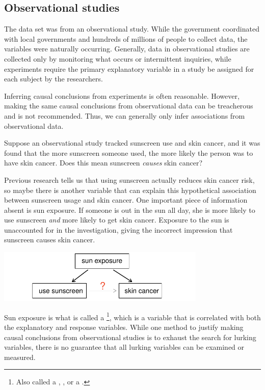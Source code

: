 \subsection{Observational studies}

The  data set was from an observational study. While the government coordinated with local governments and hundreds of millions of people to collect data, the variables were naturally occurring. Generally, data in observational studies are collected only by monitoring what occurs or intermittent inquiries, while experiments require the primary explanatory variable in a study be assigned for each subject by the researchers.

Inferring causal conclusions from experiments is often reasonable. However, making the same causal conclusions from observational data can be treacherous and is not recommended. Thus, we can generally only infer associations from observational data.

\begin{exercise} \label{sunscreenLurkingExample}
Suppose an observational study tracked sunscreen use and skin cancer, and it was found that the more sunscreen someone used, the more likely the person was to have skin cancer. Does this mean sunscreen \emph{causes} skin cancer?
\end{exercise}

Previous research tells us that using sunscreen actually reduces skin cancer risk, so maybe there is another variable that can explain this hypothetical association between sunscreen usage and skin cancer. One important piece of information absent is sun exposure. If someone is out in the sun all day, she is more likely to use sunscreen \emph{and} more likely to get skin cancer. Exposure to the sun is unaccounted for in the investigation, giving the incorrect impression that sunscreen causes skin cancer.
\begin{center}
\includegraphics[height=1.0in]{01/figures/variables/sunCausesCancer}
\end{center}

Sun exposure is what is called a \footnote{Also called a , , or a .}, which is a variable that is correlated with both the explanatory and response variables. While one method to justify making causal conclusions from observational studies is to exhaust the search for lurking variables, there is no guarantee that all lurking variables can be examined or measured.

